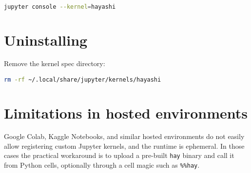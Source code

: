 \begin{lstlisting}[style=inline, language=sh]
jupyter console --kernel=hayashi
\end{lstlisting}

\section{Uninstalling}

Remove the kernel spec directory:

\begin{lstlisting}[style=inline, language=sh]
rm -rf ~/.local/share/jupyter/kernels/hayashi
\end{lstlisting}

\section{Limitations in hosted environments}

Google Colab, Kaggle Notebooks, and similar hosted environments do not easily
allow registering custom Jupyter kernels, and the runtime is ephemeral. In those
cases the practical workaround is to upload a pre-built \texttt{hay} binary and
call it from Python cells, optionally through a cell magic such as
\texttt{\%\%hay}.
